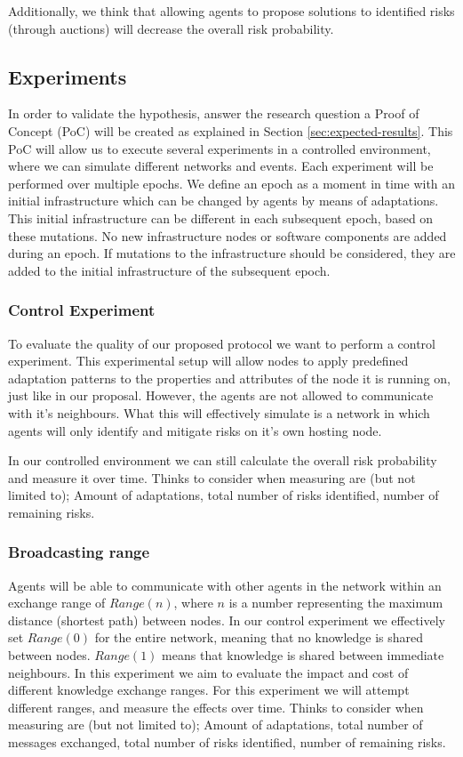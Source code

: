 Additionally, we think that allowing agents to propose solutions to identified risks (through auctions) will decrease the overall risk probability. 


\subsection{Experiments} \label{ssec:experiments}
In order to validate the hypothesis, answer the research question a Proof of Concept (PoC) will be created as explained in Section \ref{sec:expected-results}. This PoC will allow us to execute several experiments in a controlled environment, where we can simulate different networks and events. Each experiment will be performed over multiple epochs. We define an epoch as a moment in time with an initial infrastructure which can be changed by agents by means of adaptations. This initial infrastructure can be different in each subsequent epoch, based on these mutations. No new infrastructure nodes or software components are added during an epoch. If mutations to the infrastructure should be considered, they are added to the initial infrastructure of the subsequent epoch.

\subsubsection{Control Experiment} 
To evaluate the quality of our proposed protocol we want to perform a control experiment. This experimental setup will allow nodes to apply predefined adaptation patterns to the properties and attributes of the node it is running on, just like in our proposal. However, the agents are not allowed to communicate with it's neighbours. What this will effectively simulate is a network in which agents will only identify and mitigate risks on it's own hosting node. 

In our controlled environment we can still calculate the overall risk probability and measure it over time. Thinks to consider when measuring are (but not limited to); Amount of adaptations, total number of risks identified, number of remaining risks.

\subsubsection{Broadcasting range}
Agents will be able to communicate with other agents in the network within an exchange range of \( Range(n) \), where \(n\) is a number representing the maximum distance (shortest path) between nodes. In our control experiment we effectively set \( Range(0) \) for the entire network, meaning that no knowledge is shared between nodes. \( Range(1) \) means that knowledge is shared between immediate neighbours. 
In this experiment we aim to evaluate the impact and cost of different knowledge exchange ranges. For this experiment we will attempt different ranges, and measure the effects over time. Thinks to consider when measuring are (but not limited to); Amount of adaptations, total number of messages exchanged, total number of risks identified, number of remaining risks.
